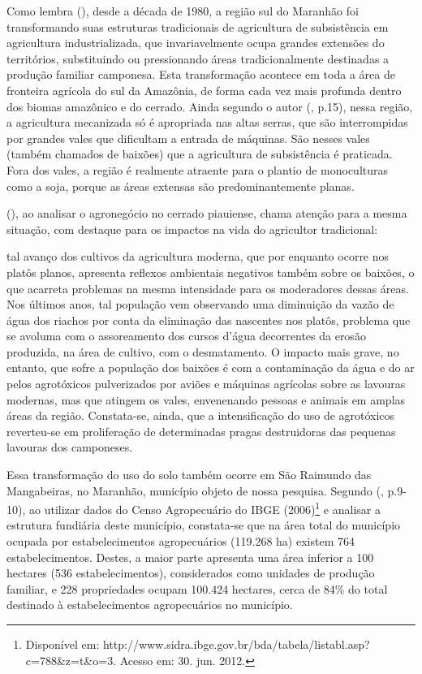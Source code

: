 Como lembra  (\citeyear{studte2008}), desde a década de 1980, a região sul do Maranhão foi transformando suas estruturas tradicionais de agricultura de subsistência em agricultura industrializada, que invariavelmente ocupa grandes extensões do territórios, substituindo ou pressionando áreas tradicionalmente destinadas a produção familiar camponesa. Esta transformação acontece em toda a área de fronteira agrícola do sul da Amazônia, de forma cada vez mais profunda dentro dos biomas amazônico e do cerrado. Ainda segundo o autor (\citeyear{studte2008}, p.15), nessa região, a agricultura mecanizada só é apropriada nas altas serras, que são interrompidas por grandes vales que dificultam a entrada de máquinas.  São nesses vales (também chamados de baixões) que a agricultura de subsistência é praticada. Fora dos vales, a região é realmente atraente para o plantio de monoculturas como a soja, porque as áreas extensas são predominantemente planas. 

 (\citeyear{alves2006}), ao analisar o agronegócio no cerrado piauiense, chama atenção para a mesma situação, com destaque para os impactos na vida do agricultor tradicional:

\begin{citacao}
tal avanço dos cultivos da agricultura moderna, que por enquanto ocorre nos platôs planos, apresenta reflexos ambientais negativos também sobre os baixões, o que acarreta problemas na mesma intensidade para os moderadores dessas áreas. Nos últimos anos, tal população vem observando uma diminuição da vazão de água dos riachos por conta da eliminação das nascentes nos platôs, problema que se avoluma com o assoreamento dos cursos d'água decorrentes da erosão produzida, na área de cultivo, com o desmatamento. O impacto mais grave, no entanto, que sofre a população dos baixões é com a contaminação da água e do ar pelos agrotóxicos pulverizados por aviões e máquinas agrícolas sobre as lavouras modernas, mas que atingem os vales, envenenando pessoas e animais em amplas áreas da região. Constata-se, ainda, que a intensificação do uso de agrotóxicos reverteu-se em proliferação de determinadas pragas destruidoras das pequenas lavouras dos camponeses. \cite[p. 278-279]{alves2006}
\end{citacao}

Essa transformação do uso do solo também ocorre em São Raimundo das Mangabeiras, no Maranhão, município objeto de nossa pesquisa. Segundo  (\citeyear{lima_locatel_silva}, p.9-10), ao utilizar dados do Censo Agropecuário do IBGE (2006)\footnote{Disponível em:
http://www.sidra.ibge.gov.br/bda/tabela/listabl.asp?c=788\&z=t\&o=3. Acesso em: 30. jun. 2012.} e analisar a estrutura fundiária deste município, constata-se que na área total do município ocupada por estabelecimentos agropecuários (119.268 ha) existem 764 estabelecimentos. Destes, a maior parte apresenta uma área inferior a 100 hectares (536 estabelecimentos), considerados como unidades de produção familiar, e 228 propriedades ocupam 100.424 hectares, cerca de 84\% do total destinado à estabelecimentos agropecuários no município. 

